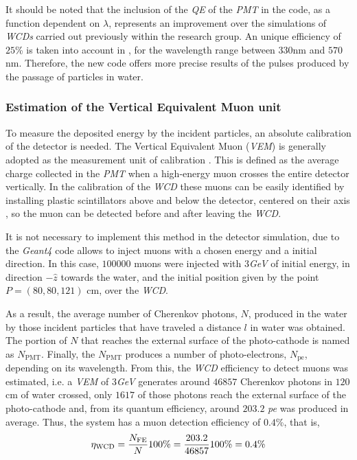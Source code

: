 \documentclass[submitting]{nst}
\begin{document}
It should be noted that the inclusion of the \textsl{QE} of the \textsl{PMT} in the code, as a function dependent on $\lambda$, represents an improvement over the simulations of \textsl{WCDs} carried out previously within the research group. An unique efficiency of $25$\% is taken into account in \cite{CalderonAsoreyNunez2015}, for the wavelength range between $330$nm and $570$nm. Therefore, the new code offers more precise results of the pulses produced by the passage of particles in water. 
 
 \subsubsection{Estimation of the Vertical Equivalent Muon unit}
 To measure the deposited energy by the incident particles, an absolute calibration of the detector is needed. The Vertical Equivalent Muon (\textsl{VEM}) is generally adopted as the measurement unit of calibration \cite{EtchegoyenEtal2005}. This is defined as the average charge collected in the \textsl{PMT} when a high-energy muon crosses the entire detector vertically. In the calibration of the \textsl{WCD} these muons can be easily identified by installing plastic scintillators above and below the detector, centered on their axis \cite{EtchegoyenEtal2005}, so the muon can be detected before and after leaving the \textsl{WCD}.
 
It is not necessary to implement this method in the detector simulation, due to the \textsl{Geant4} code allows to inject muons with a chosen energy and a initial direction. In this case, $100000$ muons were injected with $3$\textsl{GeV}   of initial energy, in direction $-\hat{z}$ towards the water, and the initial position given by the point $ P=(80, 80, 121)$ cm, over the \textsl{WCD}. 

As a result, the average number of Cherenkov photons, $N$, produced in the water by those incident particles that have traveled a distance $l$ in water was obtained. The portion of $N$ that reaches the external surface of the photo-cathode is named as $N_{\mathrm{PMT}}$. Finally, the $ N_{\mathrm{PMT}}$ produces a number of photo-electrons, $N_{\mathrm{pe}}$, depending on its wavelength. From this, the \textsl{WCD} efficiency to detect muons was estimated, i.e. a \textsl{VEM} of $3$\textsl{GeV} generates around $46857$ Cherenkov photons in $120$cm of water crossed, only $1617$ of those photons reach the external surface of the photo-cathode and, from its quantum efficiency, around $203.2$ \textsl{pe} was produced in average. Thus, the system has a muon detection efficiency of $0.4$\%, that is,
\begin{equation}
\eta_{\mathrm{WCD}}=\frac{N_{\mathrm{FE}}}{N} 100\%=\frac{203.2}{46857}100\%=0\textnormal{.}4\%
\end{equation}
\end{document}
